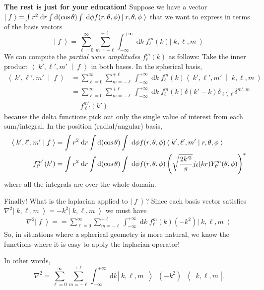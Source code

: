 \documentclass[answers]{exam}\newcommand{\repositoryInformationSetup}{     \usepackage[dvipsnames]{xcolor}     \usepackage[ angle=90, color=black, opacity=1, scale=2, ]{background}      \SetBgPosition{current page.west}      \SetBgVshift{-4.5mm}      \backgroundsetup{contents={{\color{green}\texttt{-{}-} differs from commit \texttt{f3526e2} in 0 files}}} } \newcommand{\commit}{{{\color{green}f3526e2}}}\usepackage{amsmath}
\newcommand{\grad}{\ensuremath{\nabla}\xspace}
\providecommand{\id}{}
\renewcommand{\id}[1]{\ensuremath{\; \mathrm{d}#1}}
\newcommand{\ket}[1]{\ensuremath{\left|\;#1\;\right\rangle}}
\newcommand{\bracket}[2]{\ensuremath{\left\langle\;#1\;\middle|\;#2\;\right\rangle}}
\let\braket\bracket
\newcommand{\operator}[3]{\ensuremath{\left|\;#1\;\middle\rangle\; #2\; \middle\langle\;#3\;\right|}}
\begin{document}
\begin{questions}
\begin{parts}
	\end{parts}
	{\bf The rest is just for your education!}
	Suppose we have a vector $\ket{f} = \int r^2 \id{r} \int {\rm d}(\cos\theta) \int \id{\phi} f(r,\theta,\phi) \ket{r,\theta,\phi}$ that we want to express in terms of the basis vectors
	\begin{equation}
		\label{eq:partial wave decomposition}
		\ket{f} = \sum_{\ell=0}^{\infty} \sum_{m=-\ell}^{+\ell} \int_{-\infty}^{+\infty}\id{k}\; f_\ell^m(k) \ket{k, \ell, m}
	\end{equation}
	We can compute the \emph{partial wave amplitudes} $f_\ell^m(k)$ as follows:
	Take the inner product $\braket{k',\ell',m'}{f}$ in both bases.  In the spherical basis,
	\begin{align*}
		\braket{k',\ell',m'}{f}
		 & = \sum_{\ell=0}^{\infty} \sum_{m=-\ell}^{+\ell} \int_{-\infty}^{+\infty}\id{k}\; f_\ell^m(k) \braket{k',\ell',m'}{k, \ell, m}
		\\	&= \sum_{\ell=0}^{\infty} \sum_{m=-\ell}^{+\ell} \int_{-\infty}^{+\infty}\id{k}\; f_\ell^m(k) \delta(k'-k)\delta_{\ell',\ell}\delta^{m',m}
		\\	&= f_{\ell'}^{m'}(k')
	\end{align*}
	because the delta functions pick out only the single value of interest from each sum/integral.
	In the position (radial/angular) basis,
	\begin{align*}
		\braket{k',\ell',m'}{f}
		 & = \int r^2 \id{r} \int {\rm d}(\cos\theta) \int \id{\phi} f(r,\theta,\phi) \braket{k',\ell',m'}{r,\theta,\phi}
		\\
		f_{\ell'}^{m'}(k')
		 & = \int r^2 \id{r} \int {\rm d}(\cos\theta) \int \id{\phi} f(r,\theta,\phi) \left(\sqrt{\frac{2k'^2}{\pi}}j_\ell(k r) Y_{\ell'}^{m}(\theta,\phi)\right)^*
	\end{align*}
	where all the integrals are over the whole domain.

	Finally!  What is the laplacian applied to \ket{f}?  Since each basis vector satisfies $\grad^2\ket{k,\ell,m} = -k^2 \ket{k,\ell,m}$ we must have
	\begin{align}
		\grad^2 \ket{f} =
		= \sum_{\ell=0}^{\infty} \sum_{m=-\ell}^{+\ell} \int_{-\infty}^{+\infty}\id{k}\;  f_\ell^m(k) (-k^2) \ket{k, \ell, m}
	\end{align}
	So, in situations where a spherical geometry is more natural, we know the functions where it is easy to apply the laplacian operator!

	In other words,
	\begin{equation}
		\grad^2 = \sum_{\ell=0}^{\infty} \sum_{m=-\ell}^{+\ell} \int_{-\infty}^{+\infty} \id{k} \operator{k, \ell, m}{(-k^2)}{k,\ell,m}.
	\end{equation}

\end{questions}
\end{document}
